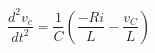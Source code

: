 \documentclass[preview]{standalone}
\begin{document}
\begin{center}
\[\frac{d^2v_c}{dt^2} = \frac{1}{C} \left( \frac{-Ri}{L} - \frac{v_C}{L} \right)\]
\end{center}
\end{document}
